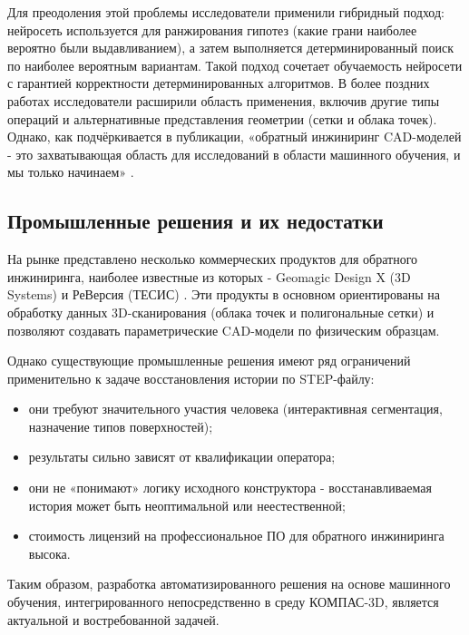 Для преодоления этой проблемы исследователи применили гибридный подход: нейросеть используется для ранжирования гипотез (какие грани наиболее вероятно были выдавливанием), а затем выполняется детерминированный поиск по наиболее вероятным вариантам. Такой подход сочетает обучаемость нейросети с гарантией корректности детерминированных алгоритмов. В более поздних работах исследователи расширили область применения, включив другие типы операций и альтернативные представления геометрии (сетки и облака точек). Однако, как подчёркивается в публикации, «обратный инжиниринг CAD-моделей - это захватывающая область для исследований в области машинного обучения, и мы только начинаем» \cite{autodesk2020}.

\subsection{Промышленные решения и их недостатки}

На рынке представлено несколько коммерческих продуктов для обратного инжиниринга, наиболее известные из которых - Geomagic Design X (3D Systems) и РеВерсия (ТЕСИС) \cite{reversia2024}. Эти продукты в основном ориентированы на обработку данных 3D-сканирования (облака точек и полигональные сетки) и позволяют создавать параметрические CAD-модели по физическим образцам.

Однако существующие промышленные решения имеют ряд ограничений применительно к задаче восстановления истории по STEP-файлу:
\begin{itemize}
\item они требуют значительного участия человека (интерактивная сегментация, назначение типов поверхностей);
\item результаты сильно зависят от квалификации оператора;
\item они не «понимают» логику исходного конструктора - восстанавливаемая история может быть неоптимальной или неестественной;
\item стоимость лицензий на профессиональное ПО для обратного инжиниринга высока.
\end{itemize}

Таким образом, разработка автоматизированного решения на основе машинного обучения, интегрированного непосредственно в среду КОМПАС-3D, является актуальной и востребованной задачей.

